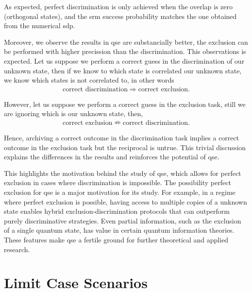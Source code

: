\documentclass[12pt,letterpaper]{article}
\begin{document}
As expected, perfect discrimination is only achieved when the overlap is zero (orthogonal states), and the \gls{srm} success probability matches the one obtained from the numerical \gls{sdp}. 

Moreover, we observe the results in \gls{qse} are substancially better, the exclusion can be performed with higher precission than the discrimination. This observations is expected. Let us suppose we perform a correct guess in the discrimination of our unknown state, then if we know to which state is correlated our unknown state, we know which states is not correlated to, in other words
\begin{align*}
	\text{correct discrimination}\Rightarrow\text{correct exclusion}.
\end{align*}

However, let us suppose we perform a correct guess in the exclusion task, still we are ignoring which is our unknown state, then,
\begin{align*}
	\text{correct exclusion}\nRightarrow\text{correct discrimination}.
\end{align*}

Hence, archiving a correct outcome in the discrimination task implies a correct outcome in the exclusion task but the reciprocal is untrue. This trivial discussion explains the differences in the results and reinforces the potential of \gls{qse}.

This highlights the motivation behind the study of \gls{qse}, which allows for perfect exclusion in cases where discrimination is impossible. The possibility perfect exclusion for \gls{qse} is a major motivation for its study. For example, in a regime where perfect exclusion is possible, having access to multiple copies of a unknown state enables hybrid exclusion-discrimination protocols that can outperform purely discriminative strategies. Even partial information, such as the exclusion of a single quantum state, has value in certain quantum information theories. These features make \gls{qse} a fertile ground for further theoretical and applied research.

\section{Limit Case Scenarios}\label{sectionLimitCaseScenarios}
\end{document}
